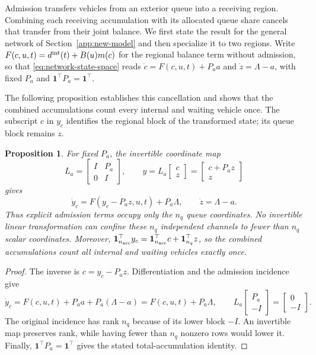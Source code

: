 \documentclass[final]{cas-sc}
\theoremstyle{definition}
\theoremstyle{plain}
\newtheorem{proposition}{Proposition}
\theoremstyle{definition}
\theoremstyle{plain}
\begin{document}
Admission transfers vehicles from an exterior queue into a receiving
region. Combining each receiving accumulation with its allocated queue
share cancels that transfer from their joint balance. We first state
the result for the general network of Section~\ref{app:new-model} and
then specialize it to two regions. Write
$F(c,u,t)=d^{\rm int}(t)+B(u)m(c)$ for the regional balance term
without admission, so that \eqref{eq:network-state-space} reads
$\dot c=F(c,u,t)+P_aa$ and $\dot z=\Lambda-a$, with fixed $P_a$ and
$\mathbf 1^\top P_a=\mathbf 1^\top$.

The following proposition establishes this cancellation and shows that
the combined accumulations count every internal and waiting vehicle
once. The subscript $c$ in $y_c$ identifies the regional block of the
transformed state; its queue block remains $z$.

\begin{proposition}
\label{prop:network-localization}
For fixed $P_a$, the invertible coordinate map
\begin{equation}
L_a=\begin{bmatrix}I&P_a\\0&I\end{bmatrix},\qquad
y=L_a\begin{bmatrix}c\\z\end{bmatrix}
=\begin{bmatrix}c+P_az\\z\end{bmatrix}
\label{eq:network-transform}
\end{equation}
gives
\begin{equation}
\dot y_c=F(y_c-P_az,u,t)+P_a\Lambda,\qquad \dot z=\Lambda-a.
\label{eq:network-transformed-flow}
\end{equation}
Thus explicit admission terms occupy only the $n_q$ queue coordinates.
No invertible linear transformation can confine these $n_q$ independent
channels to fewer than $n_q$ scalar coordinates. Moreover,
$\mathbf 1_{n_{\rm acc}}^\top y_c=\mathbf 1_{n_{\rm acc}}^\top c
+\mathbf 1_{n_q}^\top z$, so the combined accumulations count all
internal and waiting vehicles exactly once.
\end{proposition}

\begin{proof}
The inverse is $c=y_c-P_az$. Differentiation and the admission
incidence give
\[
\dot y_c=F(c,u,t)+P_aa+P_a(\Lambda-a)=F(c,u,t)+P_a\Lambda,\qquad
L_a\begin{bmatrix}P_a\\-I\end{bmatrix}
=\begin{bmatrix}0\\-I\end{bmatrix}.
\]
The original incidence has rank $n_q$ because of its lower block $-I$.
An invertible map preserves rank, while having fewer than $n_q$ nonzero
rows would lower it. Finally, $\mathbf 1^\top P_a=\mathbf 1^\top$ gives
the stated total-accumulation identity.
\end{proof}
\end{document}
